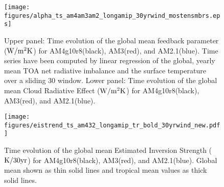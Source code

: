 \documentclass[grl]{agutex2015}
\begin{document}
%
%
%
%
%
%


\begin{figure}
  \texttt{[image: figures/alpha\_ts\_am4am3am2\_longamip\_30yrwind\_mostensmbrs.eps]}
  \caption{Upper panel: Time evolution of the global mean feedback parameter ($\rm{W/m^2 K}$) for AM4g10r8(black), AM3(red), and AM2.1(blue).  
  Time series have been computed by linear regression of the global, yearly mean TOA net radiative imbalance and the surface 
  temperature over a sliding 30 window.  Lower panel: Time evolution of the global mean Cloud Radiative Effect ($\rm{W/m^2 K}$) for 
  AM4g10r8(black), AM3(red), and AM2.1(blue).}
  \label{fig:alphacre}
\end{figure}


\begin{figure}
  \texttt{[image: figures/eistrend\_ts\_am432\_longamip\_tr\_bold\_30yrwind\_new.pdf]}
  \caption{Time evolution of the global mean Estimated Inversion Strength ($\rm{K/30 yr}$) for AM4g10r8(black), AM3(red), and    
                AM2.1(blue).  Global mean shown as thin solid lines and tropical mean values as thick solid lines.}
  \label{fig:eis}
\end{figure}
\end{document}
